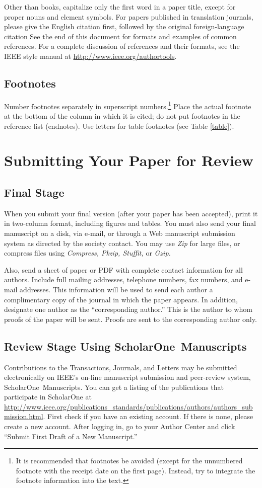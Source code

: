 \documentclass{ieeeaccess}
\begin{document}
Other than books, capitalize only the first word in a paper title, except
for proper nouns and element symbols. For papers published in translation
journals, please give the English citation first, followed by the original
foreign-language citation See the end of this document for formats and
examples of common references. For a complete discussion of references and
their formats, see the IEEE style manual at
\underline{http://www.ieee.org/authortools}.

\subsection{Footnotes}
Number footnotes separately in superscript numbers.\footnote{It is recommended that footnotes be avoided (except for
the unnumbered footnote with the receipt date on the first page). Instead,
try to integrate the footnote information into the text.} Place the actual
footnote at the bottom of the column in which it is cited; do not put
footnotes in the reference list (endnotes). Use letters for table footnotes
(see Table \ref{table}).

\section{Submitting Your Paper for Review}

\subsection{Final Stage}
When you submit your final version (after your paper has been accepted),
print it in two-column format, including figures and tables. You must also
send your final manuscript on a disk, via e-mail, or through a Web
manuscript submission system as directed by the society contact. You may use
\emph{Zip} for large files, or compress files using \emph{Compress, Pkzip, Stuffit,} or \emph{Gzip.}

Also, send a sheet of paper or PDF with complete contact information for all
authors. Include full mailing addresses, telephone numbers, fax numbers, and
e-mail addresses. This information will be used to send each author a
complimentary copy of the journal in which the paper appears. In addition,
designate one author as the ``corresponding author.'' This is the author to
whom proofs of the paper will be sent. Proofs are sent to the corresponding
author only.

\subsection{Review Stage Using ScholarOne\textregistered\ Manuscripts}
Contributions to the Transactions, Journals, and Letters may be submitted
electronically on IEEE's on-line manuscript submission and peer-review
system, ScholarOne\textregistered\ Manuscripts. You can get a listing of the
publications that participate in ScholarOne at
\underline{http://www.ieee.org/publications\_standards/publications/}\break\underline{authors/authors\_submission.html}.
First check if you have an existing account. If there is none, please create
a new account. After logging in, go to your Author Center and click ``Submit
First Draft of a New Manuscript.''
\end{document}

